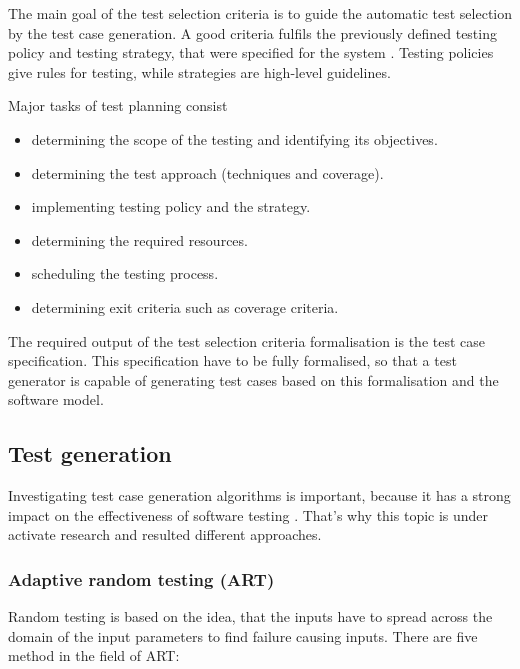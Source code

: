 The main goal of the test selection criteria is to guide the automatic test selection by the test case generation. A good criteria fulfils the previously defined testing policy and testing strategy, that were specified for the system \cite{istqb}. Testing policies give rules for testing, while strategies are high-level guidelines.

Major tasks of test planning consist

\begin{itemize}
	\item determining the scope of the testing and identifying its objectives.
	\item determining the test approach (techniques and coverage).
	\item implementing testing policy and the strategy.
	\item determining the required resources.
	\item scheduling the testing process.
	\item determining exit criteria such as coverage criteria.
\end{itemize}

The required output of the test selection criteria formalisation is the test case specification. This specification have to be fully formalised, so that a test generator is capable of generating test cases based on this formalisation and the software model.


\subsection{Test generation}
\label{sub:testgeneration}

Investigating test case generation algorithms is important, because it has a strong impact on the effectiveness of software testing \cite{testcasegen} \cite{mbttestcasegeneration}. That's why this topic is under activate research and resulted different approaches.

\subsubsection{Adaptive random testing (ART)}
\label{ssub:randomtesting}

Random testing is based on the idea, that the inputs have to spread across the domain of the input parameters to find failure causing inputs. There are five method in the field of ART:


